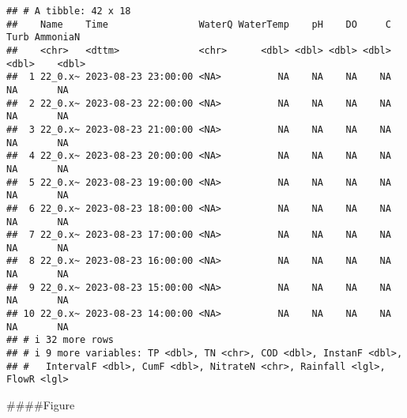 \documentclass[
]{article}
\begin{document}
\begin{verbatim}
## # A tibble: 42 x 18
##    Name    Time                WaterQ WaterTemp    pH    DO     C  Turb AmmoniaN
##    <chr>   <dttm>              <chr>      <dbl> <dbl> <dbl> <dbl> <dbl>    <dbl>
##  1 22_0.x~ 2023-08-23 23:00:00 <NA>          NA    NA    NA    NA    NA       NA
##  2 22_0.x~ 2023-08-23 22:00:00 <NA>          NA    NA    NA    NA    NA       NA
##  3 22_0.x~ 2023-08-23 21:00:00 <NA>          NA    NA    NA    NA    NA       NA
##  4 22_0.x~ 2023-08-23 20:00:00 <NA>          NA    NA    NA    NA    NA       NA
##  5 22_0.x~ 2023-08-23 19:00:00 <NA>          NA    NA    NA    NA    NA       NA
##  6 22_0.x~ 2023-08-23 18:00:00 <NA>          NA    NA    NA    NA    NA       NA
##  7 22_0.x~ 2023-08-23 17:00:00 <NA>          NA    NA    NA    NA    NA       NA
##  8 22_0.x~ 2023-08-23 16:00:00 <NA>          NA    NA    NA    NA    NA       NA
##  9 22_0.x~ 2023-08-23 15:00:00 <NA>          NA    NA    NA    NA    NA       NA
## 10 22_0.x~ 2023-08-23 14:00:00 <NA>          NA    NA    NA    NA    NA       NA
## # i 32 more rows
## # i 9 more variables: TP <dbl>, TN <chr>, COD <dbl>, InstanF <dbl>,
## #   IntervalF <dbl>, CumF <dbl>, NitrateN <chr>, Rainfall <lgl>, FlowR <lgl>
\end{verbatim}

\#\#\#\#Figure
\end{document}

